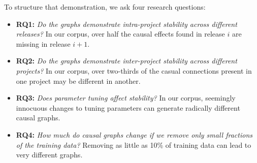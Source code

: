 \documentclass[]{svjour3}
\begin{document}
To structure that demonstration, we ask four research questions:
\begin{itemize}
    \item 
   {\bf RQ1:} {\em  Do the graphs  demonstrate intra-project stability across different
    releases? }
   In our corpus, over half the causal effects found in release $i$ are missing in release $i+1$.
    \item   
    {\bf RQ2:} {\em Do the graphs demonstrate inter-project stability across different projects? }
       In our corpus, over two-thirds of the casual connections present in one project
       may be different in another.  
      \item  
    {\bf RQ3:} {\em Does parameter tuning affect stability?} In our corpus, seemingly innocuous changes to tuning parameters can generate radically different causal graphs.
       \item 
     {\bf RQ4:}  {\em  How much do causal graphs change if we remove only small fractions
     of the training data?} Removing as little as 10\% of training data can lead to very
     different graphs.  
\end{itemize}
\end{document}
